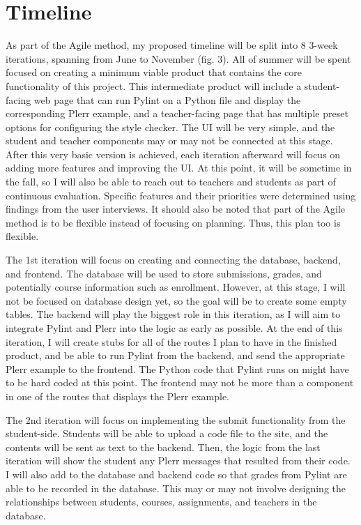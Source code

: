 \documentclass[10pt,twocolumn]{article}
\begin{document}
\section{Timeline}
As part of the Agile method, my proposed timeline will be split into 8 3-week iterations, spanning from June to November (fig. 3). All of summer will be spent focused on creating a minimum viable product that contains the core functionality of this project. This intermediate product will include a student-facing web page that can run Pylint on a Python file and display the corresponding Plerr example, and a teacher-facing page that has multiple preset options for configuring the style checker. The UI will be very simple, and the student and teacher components may or may not be connected at this stage. After this very basic version is achieved, each iteration afterward will focus on adding more features and improving the UI. At this point, it will be sometime in the fall, so I will also be able to reach out to teachers and students as part of continuous evaluation. Specific features and their priorities were determined using findings from the user interviews. It should also be noted that part of the Agile method is to be flexible instead of focusing on planning. Thus, this plan too is flexible.

The 1st iteration will focus on creating and connecting the database, backend, and frontend. The database will be used to store submissions, grades, and potentially course information such as enrollment. However, at this stage, I will not be focused on database design yet, so the goal will be to create some empty tables. The backend will play the biggest role in this iteration, as I will aim to integrate Pylint and Plerr into the logic as early as possible. At the end of this iteration, I will create stubs for all of the routes I plan to have in the finished product, and be able to run Pylint from the backend, and send the appropriate Plerr example to the frontend. The Python code that Pylint runs on might have to be hard coded at this point. The frontend may not be more than a component in one of the routes that displays the Plerr example. 

The 2nd iteration will focus on implementing the submit functionality from the student-side. Students will be able to upload a code file to the site, and the contents will be sent as text to the backend. Then, the logic from the last iteration will show the student any Plerr messages that resulted from their code. I will also add to the database and backend code so that grades from Pylint are able to be recorded in the database. This may or may not involve designing the relationships between students, courses, assignments, and teachers in the database. 
\end{document}
